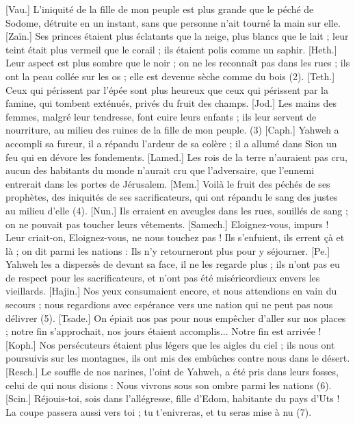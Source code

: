 \begin{multicols}{2}
[Vau.] L’iniquité de la fille de mon peuple est plus grande que le péché de Sodome, détruite en un instant, sans que personne n’ait tourné la main sur elle.
[Zaïn.] Ses princes étaient plus éclatants que la neige, plus blancs que le lait ; leur teint était plus vermeil que le corail ; ils étaient polis comme un saphir.
[Heth.] Leur aspect est plus sombre que le noir ; on ne les reconnaît pas dans les rues ; ils ont la peau collée sur les os ; elle est devenue sèche comme du bois (2).
[Teth.] Ceux qui périssent par l’épée sont plus heureux que ceux qui périssent par la famine, qui tombent exténués, privés du fruit des champs.
[Jod.] Les mains des femmes, malgré leur tendresse, font cuire leurs enfants ; ils leur servent de nourriture, au milieu des ruines de la fille de mon peuple. (3)
[Caph.] Yahweh a accompli sa fureur, il a répandu l’ardeur de sa colère ; il a allumé dans Sion un feu qui en dévore les fondements.
[Lamed.] Les rois de la terre n'auraient pas cru, aucun des habitants du monde n'aurait cru que l’adversaire, que l’ennemi entrerait dans les portes de Jérusalem.
[Mem.] Voilà le fruit des péchés de ses prophètes, des iniquités de ses sacrificateurs, qui ont répandu le sang des justes au milieu d’elle (4).
[Nun.] Ils erraient en aveugles dans les rues, souillés de sang ; on ne pouvait pas toucher leurs vêtements.
[Samech.] Eloignez-vous, impurs ! Leur criait-on, Eloignez-vous, ne nous touchez pas ! Ils s'enfuient, ils errent çà et là ; on dit parmi les nations : Ils n’y retourneront plus pour y séjourner.
[Pe.] Yahweh les a dispersés de devant sa face, il ne les regarde plus ; ils n’ont pas eu de respect pour les sacrificateurs, et n'ont pas été miséricordieux envers les vieillards.
[Hajin.] Nos yeux consumaient encore, et nous attendions en vain du secours ; nous regardions avec espérance vers une nation qui ne peut pas nous délivrer (5).
[Tsade.] On épiait nos pas pour nous empêcher d'aller sur nos places ; notre fin s'approchait, nos jours étaient accomplis... Notre fin est arrivée !
[Koph.] Nos persécuteurs étaient plus légers que les aigles du ciel ; ils nous ont poursuivis sur les montagnes, ils ont mis des embûches contre nous dans le désert.
[Resch.] Le souffle de nos narines, l’oint de Yahweh, a été pris dans leurs fosses, celui de qui nous disions : Nous vivrons sous son ombre parmi les nations (6).
[Scin.] Réjouis-toi, sois dans l’allégresse, fille d’Edom, habitante du pays d'Uts ! La coupe passera aussi vers toi ; tu t'enivreras, et tu seras mise à nu (7).

\end{multicols}
